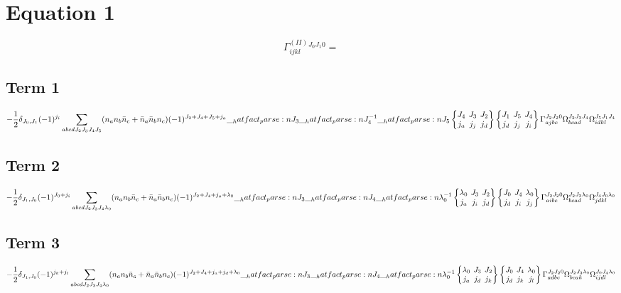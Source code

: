 \documentclass{scrartcl}
\newcommand{\sixj}[6]{\begingroup\setlength{\arraycolsep}{0.2em}\begin{Bmatrix} #1 & #2 & #3 \\ #4 & #5 & #6 \end{Bmatrix}\endgroup}
\begin{document}
\section{Equation 1}
\begin{dmath*}
\Gamma^{(II)}_{i j k l}^{{J}_{0} {J}_{1} 0} = 
\end{dmath*}
\subsection{Term 1}
\begin{dmath*}
-\frac{1}{2} \* \delta_{{J}_{0},{J}_{1}} \* (-1)^{{j}_{i}} \* \sum_{a b c d {J}_{2} {J}_{3} {J}_{4} {J}_{5}} \* (n_{a} \* n_{b} \* \bar{n}_{c} + \bar{n}_{a} \* \bar{n}_{b} \* n_{c}) \* (-1)^{{J}_{2}+{J}_{4}+{J}_{5}+{j}_{a}} \* \hatfact{{J}_{3}} \* \hatfact{{J}_{4}^{-1}} \* \hatfact{{J}_{5}} \* \sixj{{J}_{4}}{{J}_{3}}{{J}_{2}}{{j}_{a}}{{j}_{j}}{{j}_{d}} \* \sixj{{J}_{1}}{{J}_{5}}{{J}_{4}}{{j}_{d}}{{j}_{j}}{{j}_{i}} \* \Gamma_{a j b c}^{{J}_{2} {J}_{2} 0} \* \Omega_{b c a d}^{{J}_{2} {J}_{3} {J}_{4}} \* \Omega_{i d k l}^{{J}_{5} {J}_{1} {J}_{4}}
\end{dmath*}
\subsection{Term 2}
\begin{dmath*}
-\frac{1}{2} \* \delta_{{J}_{1},{J}_{0}} \* (-1)^{{J}_{0}+{j}_{i}} \* \sum_{a b c d {J}_{2} {J}_{3} {J}_{4} {{\lambda}}_{0}} \* (n_{a} \* n_{b} \* \bar{n}_{c} + \bar{n}_{a} \* \bar{n}_{b} \* n_{c}) \* (-1)^{{J}_{2}+{J}_{4}+{j}_{a}+{{\lambda}}_{0}} \* \hatfact{{J}_{3}} \* \hatfact{{J}_{4}} \* \hatfact{{{\lambda}}_{0}^{-1}} \* \sixj{{{\lambda}}_{0}}{{J}_{3}}{{J}_{2}}{{j}_{a}}{{j}_{i}}{{j}_{d}} \* \sixj{{J}_{0}}{{J}_{4}}{{{\lambda}}_{0}}{{j}_{d}}{{j}_{i}}{{j}_{j}} \* \Gamma_{a i b c}^{{J}_{2} {J}_{2} 0} \* \Omega_{b c a d}^{{J}_{2} {J}_{3} {{\lambda}}_{0}} \* \Omega_{j d k l}^{{J}_{4} {J}_{0} {{\lambda}}_{0}}
\end{dmath*}
\subsection{Term 3}
\begin{dmath*}
-\frac{1}{2} \* \delta_{{J}_{1},{J}_{0}} \* (-1)^{{j}_{k}+{j}_{l}} \* \sum_{a b c d {J}_{2} {J}_{3} {J}_{4} {{\lambda}}_{0}} \* (n_{a} \* n_{b} \* \bar{n}_{c} + \bar{n}_{a} \* \bar{n}_{b} \* n_{c}) \* (-1)^{{J}_{2}+{J}_{4}+{j}_{a}+{j}_{d}+{{\lambda}}_{0}} \* \hatfact{{J}_{3}} \* \hatfact{{J}_{4}} \* \hatfact{{{\lambda}}_{0}^{-1}} \* \sixj{{{\lambda}}_{0}}{{J}_{3}}{{J}_{2}}{{j}_{a}}{{j}_{d}}{{j}_{k}} \* \sixj{{J}_{0}}{{J}_{4}}{{{\lambda}}_{0}}{{j}_{d}}{{j}_{k}}{{j}_{l}} \* \Gamma_{a d b c}^{{J}_{2} {J}_{2} 0} \* \Omega_{b c a k}^{{J}_{2} {J}_{3} {{\lambda}}_{0}} \* \Omega_{i j d l}^{{J}_{0} {J}_{4} {{\lambda}}_{0}}
\end{dmath*}
\end{document}
